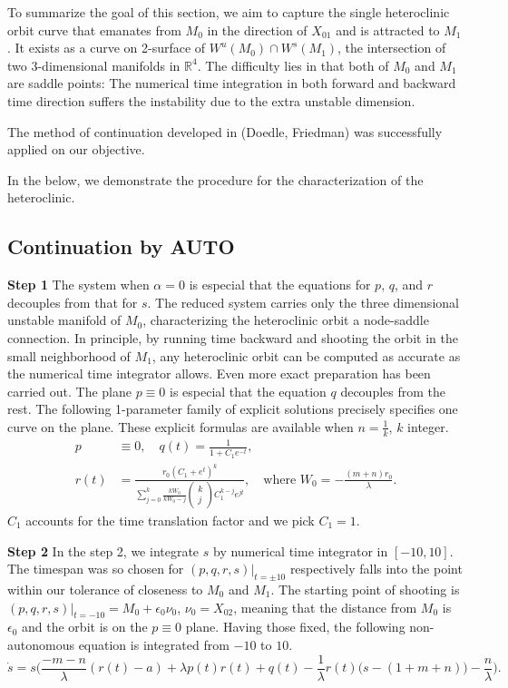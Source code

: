 \documentclass[a4paper,11pt]{article}
\theoremstyle{remark}
\begin{document}
To summarize the goal of this section, we aim to capture the single heteroclinic orbit curve that emanates from $M_0$ in the direction of $X_{01}$ and is attracted to $M_1$. It exists as a curve on 2-surface of $W^u(M_0)\cap W^s(M_1)$, the intersection of two 3-dimensional manifolds in $\mathbb{R}^4$. The difficulty lies in that both of $M_0$ and $M_1$ are saddle points: The numerical time integration in both forward and backward time direction suffers the instability due to the extra unstable dimension.

The method of continuation developed in {(Doedle, Friedman)} was successfully applied on our objective.

In the below, we demonstrate the procedure for the characterization of the heteroclinic.
\subsection{Continuation by AUTO}
{\bf \noindent Step 1}
The system when $\alpha=0$ is especial that the equations for $p$, $q$, and $r$ decouples from that for $s$. The reduced system carries only the three dimensional unstable manifold of $M_0$, characterizing the heteroclinic orbit a node-saddle connection. In principle, by running time backward and shooting the orbit in the small neighborhood of $M_1$, any heteroclinic orbit can be computed as accurate as the numerical time integrator allows. Even more exact preparation has been carried out. The plane $p\equiv0$ is especial that the equation $q$ decouples from the rest. The following 1-parameter family of explicit solutions precisely specifies one curve on the plane. These explicit formulas are available when $n= \frac{1}{k}$, $k$ integer.
\begin{align}
 p&\equiv0, \quad q(t) = \frac{1}{1+C_1e^{-t}},\\
 r(t) &= \frac{r_0 \left(C_1 + e^t\right)^k}{ \displaystyle \sum_{j=0}^k \frac{kW_0}{kW_0 -j}\begin{pmatrix} k\\j\end{pmatrix}C_1^{k-j} e^{jt}} , \quad \text{where $W_0= - \frac{(m+n)r_0}{\lambda}$}.
\end{align}
$C_1$ accounts for the time translation factor and we pick $C_1=1$.

{\bf \noindent Step 2}
In the step 2, we integrate $s$ by numerical time integrator in $[-10,10]$. The timespan was so chosen for $(p,q,r,s)|_{t=\pm10}$ respectively falls into the point within our tolerance of closeness to $M_0$ and $M_1$. The starting point of shooting is $(p,q,r,s)|_{t=-10} = M_0 + \epsilon_0 \nu_0$, $\nu_0 = X_{02}$, meaning that the distance from $M_0$ is $\epsilon_0$ and the orbit is on the $p\equiv0$ plane. Having those fixed, the following non-autonomous equation is integrated from $-10$ to $10$.
$$\dot{s} =s\Big(\frac{-m-n}{\lambda}(r(t)-a) + \lambda p(t)r(t) + q(t) - \frac{1}{\lambda}r(t)\big(s- (1+m+n)\big) - \frac{n}{\lambda}\Big).$$
\end{document}
